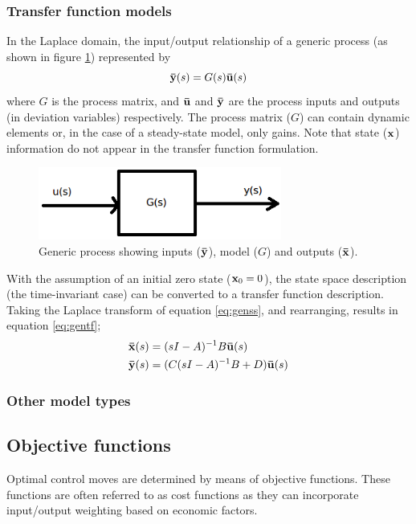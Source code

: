 \subsubsection{Transfer function models}
In the Laplace domain, the input/output relationship of a generic process (as shown in figure \ref{fig:genmodel}) represented by
\begin{equation*}
  {\bf {\bar y}}(s)=G(s){\bf {\bar u}}(s)
\end{equation*}
where $G$ is the process matrix, and ${\bf {\bar u}}$ and ${\bf {\bar y}}$ are the process inputs and outputs (in deviation variables) respectively.
The process matrix ($G$) can contain dynamic elements or, in the case of a steady-state model, only gains.
Note that state (${\bf {x}}$) information do not appear in the transfer function formulation.
\begin{figure}[htbp]
  \centering
  \includegraphics[width=8cm]{graph/model_genprocess}
  \caption[Generic input/output model]{Generic process showing inputs (${\bf {\bar y}}$), model ($G$) and outputs (${\bf {\bar x}}$).}
  \label{fig:genmodel}
\end{figure}
With the assumption of an initial zero state (${\bf {x}}_0=0$), the state space description (the time-invariant case) can be converted to a transfer function description.
Taking the Laplace transform of equation \ref{eq:genss}, and rearranging, results in equation \ref{eq:gentf};
\begin{align}
  \label{eq:gentf}
    {\bf {\bar x}}(s) &= (sI-A)^{-1}B{\bf {\bar u}}(s) \\
    {\bf {\bar y}}(s) &= (C(sI-A)^{-1}B+D){\bf {\bar u}}(s) \notag
\end{align} 
\subsubsection{Other model types}

\subsection{Objective functions}
Optimal control moves are determined by means of objective functions.
These functions are often referred to as cost functions \citep[41]{maciejowskimpc} as they can incorporate input/output weighting based on economic factors.

